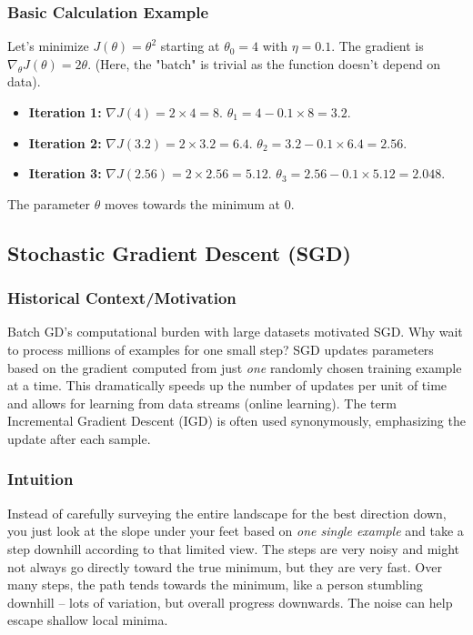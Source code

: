 \documentclass{article}
\begin{document}
\subsubsection{Basic Calculation Example}
Let's minimize $J(\theta) = \theta^2$ starting at $\theta_0 = 4$ with $\eta = 0.1$. The gradient is $\nabla_{\theta} J(\theta) = 2\theta$. (Here, the "batch" is trivial as the function doesn't depend on data).
\begin{itemize}
    \item \textbf{Iteration 1:} $\nabla J(4) = 2 \times 4 = 8$. $\theta_1 = 4 - 0.1 \times 8 = 3.2$.
    \item \textbf{Iteration 2:} $\nabla J(3.2) = 2 \times 3.2 = 6.4$. $\theta_2 = 3.2 - 0.1 \times 6.4 = 2.56$.
    \item \textbf{Iteration 3:} $\nabla J(2.56) = 2 \times 2.56 = 5.12$. $\theta_3 = 2.56 - 0.1 \times 5.12 = 2.048$.
\end{itemize}
The parameter $\theta$ moves towards the minimum at 0.

\subsection{Stochastic Gradient Descent (SGD)}

\subsubsection{Historical Context/Motivation}
Batch GD's computational burden with large datasets motivated SGD. Why wait to process millions of examples for one small step? SGD updates parameters based on the gradient computed from just \emph{one} randomly chosen training example at a time. This dramatically speeds up the number of updates per unit of time and allows for learning from data streams (online learning). The term Incremental Gradient Descent (IGD) is often used synonymously, emphasizing the update after each sample.

\subsubsection{Intuition}
Instead of carefully surveying the entire landscape for the best direction down, you just look at the slope under your feet based on \emph{one single example} and take a step downhill according to that limited view. The steps are very noisy and might not always go directly toward the true minimum, but they are very fast. Over many steps, the path tends towards the minimum, like a person stumbling downhill – lots of variation, but overall progress downwards. The noise can help escape shallow local minima.
\end{document}
